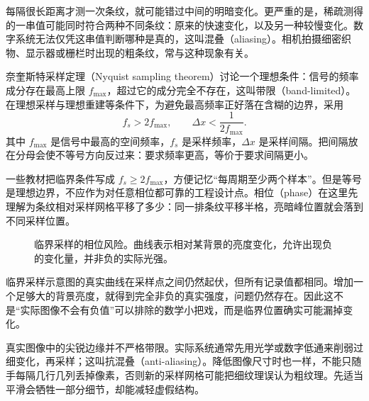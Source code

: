 每隔很长距离才测一次条纹，就可能错过中间的明暗变化。更严重的是，稀疏测得的一串值可能同时符合两种不同条纹：原来的快速变化，以及另一种较慢变化。数字系统无法仅凭这串值判断哪种是真的，这叫混叠（aliasing）。相机拍摄细密织物、显示器或栅栏时出现的粗条纹，常与这种现象有关。

奈奎斯特采样定理（Nyquist sampling theorem）讨论一个理想条件：信号的频率成分存在最高上限 $f_{\max}$，超过它的成分完全不存在，这叫带限（band-limited）。在理想采样与理想重建等条件下，为避免最高频率正好落在含糊的边界，采用
\[
  f_s>2f_{\max},\qquad
  \Delta x<\frac{1}{2f_{\max}}.
\]
其中 $f_{\max}$ 是信号中最高的空间频率，$f_s$ 是采样频率，$\Delta x$ 是采样间隔。把间隔放在分母会使不等号方向反过来：要求频率更高，等价于要求间隔更小。

一些教材把临界条件写成 $f_s\geq2f_{\max}$，方便记忆“每周期至少两个样本”。但是等号是理想边界，不应作为对任意相位都可靠的工程设计点。相位（phase）在这里先理解为条纹相对采样网格平移了多少：同一排条纹平移半格，亮暗峰位置就会落到不同采样位置。

\begin{figure}[htbp]
\centering
{}
\caption{临界采样的相位风险。曲线表示相对某背景的亮度变化，允许出现负的变化量，并非负的实际光强。}
\end{figure}

临界采样示意图的真实曲线在采样点之间仍然起伏，但所有记录值都相同。增加一个足够大的背景亮度，就得到完全非负的真实强度，问题仍然存在。因此这不是“实际图像不会有负值”可以排除的数学小把戏，而是临界位置确实可能漏掉变化。

真实图像中的尖锐边缘并不严格带限。实际系统通常先用光学或数字低通来削弱过细变化，再采样；这叫抗混叠（anti-aliasing）。降低图像尺寸时也一样，不能只随手每隔几行几列丢掉像素，否则新的采样网格可能把细纹理误认为粗纹理。先适当平滑会牺牲一部分细节，却能减轻虚假结构。

